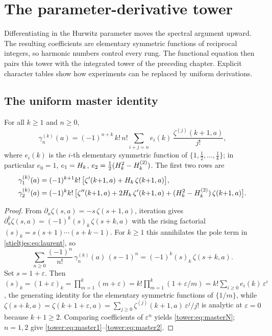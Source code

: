 \chapter{The parameter-derivative tower}
\label{ch:08-differentiation}

Differentiating in the Hurwitz parameter moves the spectral argument upward.
The resulting coefficients are elementary symmetric functions of reciprocal
integers, so harmonic numbers control every rung. The functional equation
then pairs this tower with the integrated tower of the preceding chapter.
Explicit character tables show how experiments can be replaced by uniform
derivations.

\section{The uniform master identity}\label{tower:sec:master}

\begin{theorem}\label{tower:thm:master}
For all $k\ge1$ and $n\ge0$,
\begin{equation}\label{tower:eq:masterN}
  \gamma_n^{(k)}(a)=(-1)^{n+k}\,k!\,n!\sum_{i+j=n} e_i(k)\,
   \frac{\zeta^{(j)}(k{+}1,a)}{j!},
\end{equation}
where $e_i(k)$ is the $i$-th elementary symmetric function of
$\{1,\tfrac12,\dots,\tfrac1k\}$; in particular $e_0=1$, $e_1=H_{k}$,
$e_2=\tfrac12(H_{k}^2-H_{k}^{(2)})$. The first two rows are
\begin{align}
  \gamma_1^{(k)}(a)&=(-1)^{k+1}k!\,\bigl[\zeta'(k{+}1,a)+H_{k}\,\zeta(k{+}1,a)\bigr],
   \label{tower:eq:master1}\\
  \gamma_2^{(k)}(a)&=(-1)^{k}k!\,\bigl[\zeta''(k{+}1,a)+2H_{k}\,\zeta'(k{+}1,a)
   +(H_{k}^2-H_{k}^{(2)})\,\zeta(k{+}1,a)\bigr].\label{tower:eq:master2}
\end{align}
\end{theorem}

\begin{proof}
From $\partial_a\zeta(s,a)=-s\,\zeta(s{+}1,a)$, iteration gives
$\partial_a^k\zeta(s,a)=(-1)^k (s)_k\,\zeta(s{+}k,a)$ with the rising factorial
$(s)_k=s(s{+}1)\cdots(s{+}k{-}1)$. For $k\ge1$ this annihilates the pole term in
\eqref{stieltjes:eq:laurent}, so
\[
  \sum_{n\ge0}\frac{(-1)^n}{n!}\,\gamma_n^{(k)}(a)\,(s-1)^n
   =(-1)^k(s)_k\,\zeta(s{+}k,a).
\]
Set $s=1+\varepsilon$. Then
$(s)_k=(1+\varepsilon)_k=\prod_{m=1}^k(m+\varepsilon)=k!\prod_{m=1}^k(1+\varepsilon/m)
 =k!\sum_{i\ge0}e_i(k)\,\varepsilon^i$,
the generating identity for the elementary symmetric functions of $\{1/m\}$,
while $\zeta(s{+}k,a)=\zeta(k{+}1{+}\varepsilon,a)=\sum_{j\ge0}\zeta^{(j)}(k{+}1,a)\,\varepsilon^j/j!$
is analytic at $\varepsilon=0$ because $k{+}1\ge2$. Comparing coefficients of
$\varepsilon^n$ yields \eqref{tower:eq:masterN}; $n=1,2$ give
\eqref{tower:eq:master1}--\eqref{tower:eq:master2}.
\end{proof}

